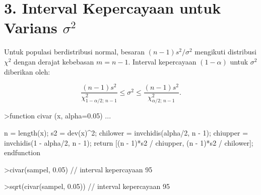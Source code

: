 \documentclass[a4paper,11pt,oneside,enabledeprecatedfontcommands]{scrbook}
\newenvironment{eulernotebook}{}{}
\newcommand{\eulersubheading}[1]{\section{#1}}
\newenvironment{eulercomment}{\par\medskip\noindent}{\par\medskip}
\newenvironment{eulerformula}{}{}
\begin{document}
\begin{eulernotebook}
		\eulersubheading{3. Interval Kepercayaan untuk Varians $\sigma^2$}
		\begin{eulercomment}
			Untuk populasi berdistribusi normal, besaran $(n-1)s^2/\sigma^2$ mengikuti distribusi $\chi^2$ dengan derajat kebebasan $m = n - 1$. Interval kepercayaan $(1-\alpha)$ untuk
			$\sigma^2$ diberikan oleh:
		\end{eulercomment}
		\begin{eulerformula}
			\[
			\frac{(n-1)s^2}{\chi^2_{1-\alpha/2; \, n-1}} \le \sigma^2 \le \frac{(n-1)s^2}{\chi^2_{\alpha/2; \, n-1}}.
			\]
		\end{eulerformula}
		\begin{eulerprompt}
			>function civar (x, alpha=0.05) ...
		\end{eulerprompt}
		\begin{eulerudf}
			n = length(x);
			s2 = dev(x)^2;
			chilower = invchidis(alpha/2, n - 1);
			chiupper = invchidis(1 - alpha/2, n - 1);
			return [(n - 1)*s2 / chiupper, (n - 1)*s2 / chilower];
			endfunction
		\end{eulerudf}
		\begin{eulerprompt}
			>civar(sampel, 0.05) // interval kepercayaan 95%
		\end{eulerprompt}
		\begin{euleroutput}
			[0,  9.3237e-05]
		\end{euleroutput}
		\begin{eulerprompt}
			>sqrt(civar(sampel, 0.05)) // interval kepercayaan 95%
		\end{eulerprompt}
		\begin{euleroutput}
			[0.0024575,  0.009656]
		\end{euleroutput}
		

\end{eulernotebook}
\end{document}
